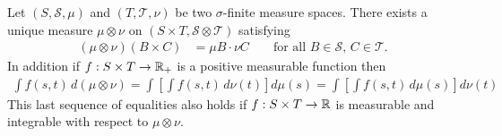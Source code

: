 \begin{thm}\label{Fubini}Let $(S, \mathcal{S}, \mu)$
  and $(T, \mathcal{T}, \nu)$ be two $\sigma$-finite measure spaces.
  There exists a unique measure $\mu \otimes \nu$ on $(S \times T,
  \mathcal{S} \otimes \mathcal{T})$ satisfying 
\begin{align*}
(\mu \otimes \nu)(B \times C) &= \mu B \cdot \nu C & &\text{ for all
  $B \in \mathcal{S}$, $C \in \mathcal{T}$.}
\end{align*}
In addition if $f : S \times T \to \mathbb{R}_+$ is a positive measurable
function then 
\begin{align*}
\int f(s,t) \,  d (\mu \otimes \nu) = \int \left [ \int f(s,t) \, d
\nu(t) \right ] d \mu(s)  = \int \left [ \int f(s,t) \, d \mu(s)
\right ] d\nu(t)
\end{align*}
This last sequence of equalities also holds if $f : S \times T \to \mathbb{R}$
is measurable and integrable with respect to $\mu \otimes \nu$.
\end{thm}
